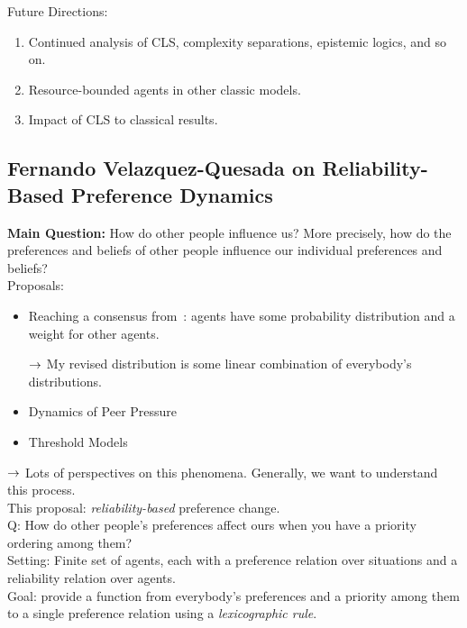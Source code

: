 Future Directions:
\begin{enumerate}
    \item Continued analysis of CLS, complexity separations, epistemic logics, and so on.
    \item Resource-bounded agents in other classic models.
    \item Impact of CLS to classical results.
\end{enumerate}

\spacerule
\subsection{Fernando Velazquez-Quesada on Reliability-Based Preference Dynamics}

{\bf Main Question:} How do other people influence us? More precisely, how do the preferences and beliefs of other people influence our individual preferences and beliefs? \\

Proposals:
\begin{itemize}
    \item Reaching a consensus from~\citet{degroot1974reaching}: agents have some probability distribution and a weight for other agents.
    
    $\rightarrow$ My revised distribution is some linear combination of everybody's distributions.
    
    \item Dynamics of Peer Pressure
    
    \item Threshold Models
\end{itemize}

$\rightarrow$ Lots of perspectives on this phenomena. Generally, we want to understand this process. \\

This proposal: {\it reliability-based} preference change. \\

Q: How do other people's preferences affect ours when you have a priority ordering among them? \\

Setting: Finite set of agents, each with a preference relation over situations and a reliability relation over agents. \\

Goal: provide a function from everybody's preferences and a priority among them to a single preference relation using a {\it lexicographic rule}. \\


